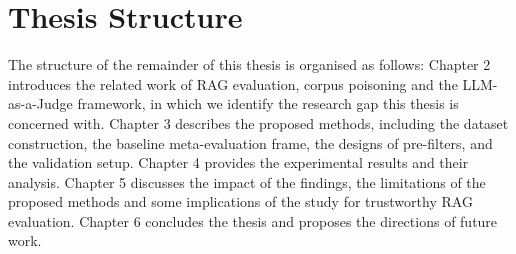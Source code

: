 \section{Thesis Structure}

The structure of the remainder of this thesis is organised as follows: Chapter 2 introduces the related work of RAG evaluation, corpus poisoning and the LLM-as-a-Judge framework, in which we identify the research gap this thesis is concerned with. Chapter 3 describes the proposed methods, including the dataset construction, the baseline meta-evaluation frame, the designs of pre-filters, and the validation setup. Chapter 4 provides the experimental results and their analysis. Chapter 5 discusses the impact of the findings, the limitations of the proposed methods and some implications of the study for trustworthy RAG evaluation. Chapter 6 concludes the thesis and proposes the directions of future work.
